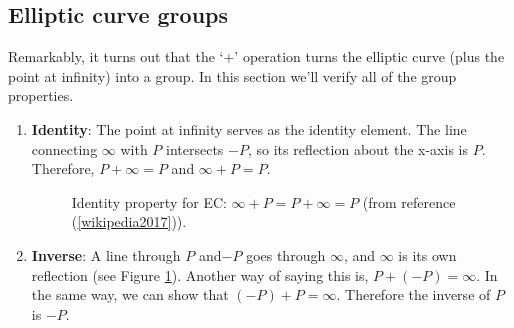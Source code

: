 \subsection{Elliptic curve groups}
Remarkably, it turns out that the `+' operation turns the elliptic curve (plus the point at infinity)  into a group.  In this section we'll verify all of the group properties. 

\begin{enumerate}[1.]
\item \textbf{Identity}: The point at infinity serves as the identity element.  The line connecting $\infty$ with $P$ intersects $-P$, so its reflection about the x-axis is $P$. Therefore, $P + \infty = P$ and $\infty + P = P$. 
\begin{figure}[htbp]
	  \caption{\label{fig:DH:DHKE_13} Identity property for EC: $\infty + P = P + \infty = P$ (from reference (\ref{wikipedia2017})).}
\end{figure}
\item \textbf{Inverse}: A line through $P$ and$-P$ goes through $\infty$, and $\infty$ is its own reflection (see Figure \ref{fig:DH:DHKE_13}). Another way of saying this is, $P + (- P) = \infty$. In the same way, we can show that $(-P) + P = \infty$. Therefore the inverse of $P$ is $-P$. 


\end{enumerate}
